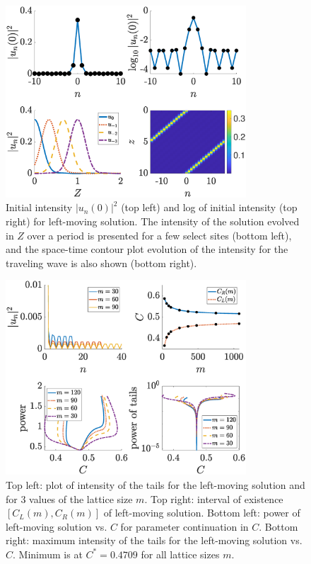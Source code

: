 \documentclass[reprint, amsmath,amssymb,aps,pre]{revtex4-2}
\begin{document}
\begin{figure}
    \centering
    \includegraphics[width=9cm]{leftsol.eps}
    \caption{Initial intensity $|u_n(0)|^2$ (top left) and log of initial intensity (top right) for left-moving solution. The intensity of the solution evolved in $Z$ over a period is presented for a few select sites (bottom left), and the space-time contour 
    plot evolution of the intensity for the traveling wave is also shown (bottom right).}
    \label{fig:leftsol}
\end{figure}

\begin{figure}
    \centering
    \includegraphics[width=9cm]{leftdiag.eps}
    \caption{Top left: plot of intensity of the tails for the left-moving solution and for 3 values of the lattice size $m$. Top right: interval of existence $[C_L(m),C_R(m)]$ of left-moving solution. Bottom left: power of left-moving solution vs. $C$ for parameter
    continuation in $C$. Bottom right: maximum intensity of the tails for the left-moving solution vs. $C$. Minimum is at $C^* = 0.4709$ for all lattice sizes $m$.}
    \label{fig:leftdiag}
\end{figure}
\end{document}
